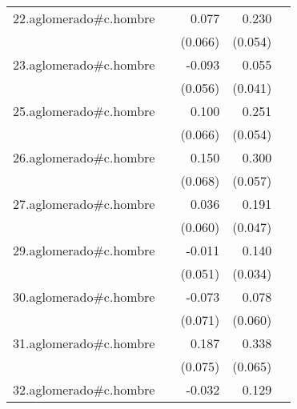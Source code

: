 {\begin{longtable}{l*{4}{D{.}{.}{-1}}}
\addlinespace
22.aglomerado#c.hombre&                     &       0.077         &       0.230\sym{***}&                     \\
            &                     &     (0.066)         &     (0.054)         &                     \\
\addlinespace
23.aglomerado#c.hombre&                     &      -0.093         &       0.055         &                     \\
            &                     &     (0.056)         &     (0.041)         &                     \\
\addlinespace
25.aglomerado#c.hombre&                     &       0.100         &       0.251\sym{***}&                     \\
            &                     &     (0.066)         &     (0.054)         &                     \\
\addlinespace
26.aglomerado#c.hombre&                     &       0.150\sym{*}  &       0.300\sym{***}&                     \\
            &                     &     (0.068)         &     (0.057)         &                     \\
\addlinespace
27.aglomerado#c.hombre&                     &       0.036         &       0.191\sym{***}&                     \\
            &                     &     (0.060)         &     (0.047)         &                     \\
\addlinespace
29.aglomerado#c.hombre&                     &      -0.011         &       0.140\sym{***}&                     \\
            &                     &     (0.051)         &     (0.034)         &                     \\
\addlinespace
30.aglomerado#c.hombre&                     &      -0.073         &       0.078         &                     \\
            &                     &     (0.071)         &     (0.060)         &                     \\
\addlinespace
31.aglomerado#c.hombre&                     &       0.187\sym{*}  &       0.338\sym{***}&                     \\
            &                     &     (0.075)         &     (0.065)         &                     \\
\addlinespace
32.aglomerado#c.hombre&                     &      -0.032         &       0.129\sym{***}&                     \\

\end{longtable}}
